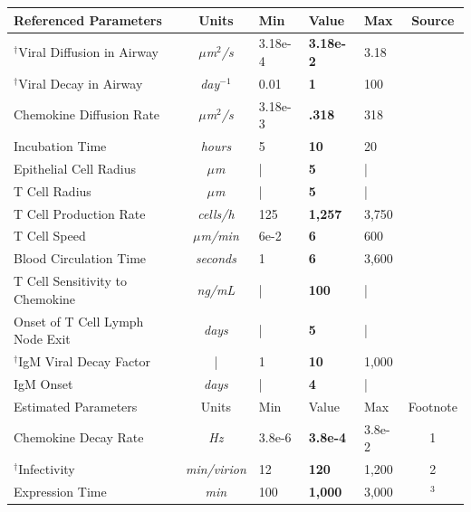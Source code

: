 \documentclass[10pt]{article}
\begin{document}
\begin{table}[!ht]
\begin{center}
\begin{tabular}{| l | c | l l l | c |}
  \hline                        
  Referenced Parameters & Units & Min & Value & Max & Source \\
  \hline
  $^{\dagger}$Viral Diffusion in Airway & \textit{$\mu$m$^2$/s} & 3.18e-4 & \textbf{3.18e-2} & 3.18  & \cite{Beauchemin2006} \\
  $^{\dagger}$Viral Decay in Airway & \textit{day$^{-1}$} & 0.01 & \textbf{1} & 100 & \cite{Lee2009} \\
  Chemokine Diffusion Rate & \textit{$\mu$m$^2$/s} & 3.18e-3 & \textbf{.318} & 318 & \cite{Beauchemin2006} \\
  Incubation Time & \textit{hours} & 5 & \textbf{10} & 20 & \cite{Mitchell2011} \\
  Epithelial Cell Radius & \textit{$\mu$m} & | & \textbf{5} & | & \cite{Elbert1999} \\
  T Cell Radius & \textit{$\mu$m} & | & \textbf{5} & | & \cite{abbas2011cellular} \\
  T Cell Production Rate & \textit{cells/h} & 125 & \textbf{1,257} & 3,750 & \cite{Miao2010} \\ 
  T Cell Speed & \textit{$\mu$m/min} & 6e-2 & \textbf{6} & 600 & \cite{Egen2011} \\
  Blood Circulation Time & \textit{seconds} & 1 & \textbf{6} & 3,600 & \cite{Banerjee2010b} \\
  T Cell Sensitivity to Chemokine & \textit{ng/mL} & | & \textbf{100} & | & \cite{Nandagopal2011} \\
  Onset of T Cell Lymph Node Exit & \textit{days }& | & \textbf{5} & | & \cite{Banerjee2011} \\
  $^{\dagger}$IgM Viral Decay Factor & | & 1 & \textbf{10} & 1,000 & \cite{Diamond2003} \\
  IgM Onset & \textit{days} & | & \textbf{4} & | & \cite{Diamond2003} \\
  \hline
  \hline                        
  Estimated Parameters & Units & Min & Value & Max & Footnote \\
  \hline
  Chemokine Decay Rate & \textit{Hz} & 3.8e-6 & \textbf{3.8e-4} & 3.8e-2 & 1\\
  $^{\dagger}$Infectivity & \textit{min/virion} & 12 & \textbf{120} & 1,200   &  2 \\
  Expression Time & \textit{min} & 100 & \textbf{1,000} & 3,000 & \cite{Mitchell2011}$^3$ \\

\end{tabular}
\end{center}
\end{table}
\end{document}
